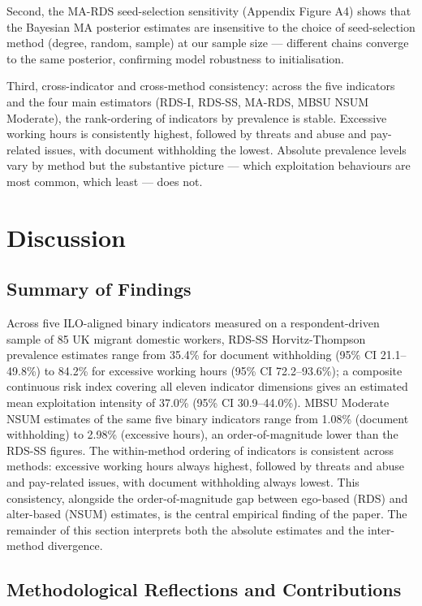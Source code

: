 \documentclass[
  12pt,
  letterpaper,
  DIV=11,
  numbers=noendperiod]{scrartcl}
\begin{document}
Second, the MA-RDS seed-selection sensitivity (Appendix Figure A4) shows
that the Bayesian MA posterior estimates are insensitive to the choice
of seed-selection method (degree, random, sample) at our sample size ---
different chains converge to the same posterior, confirming model
robustness to initialisation.

Third, cross-indicator and cross-method consistency: across the five
indicators and the four main estimators (RDS-I, RDS-SS, MA-RDS, MBSU
NSUM Moderate), the rank-ordering of indicators by prevalence is stable.
Excessive working hours is consistently highest, followed by threats and
abuse and pay-related issues, with document withholding the lowest.
Absolute prevalence levels vary by method but the substantive picture
--- which exploitation behaviours are most common, which least --- does
not.

\section{Discussion}\label{sec-discussion}

\subsection{Summary of Findings}\label{sec-summary}

Across five ILO-aligned binary indicators measured on a
respondent-driven sample of 85 UK migrant domestic workers, RDS-SS
Horvitz-Thompson prevalence estimates range from 35.4\% for document
withholding (95\% CI 21.1--49.8\%) to 84.2\% for excessive working hours
(95\% CI 72.2--93.6\%); a composite continuous risk index covering all
eleven indicator dimensions gives an estimated mean exploitation
intensity of 37.0\% (95\% CI 30.9--44.0\%). MBSU Moderate NSUM estimates
of the same five binary indicators range from 1.08\% (document
withholding) to 2.98\% (excessive hours), an order-of-magnitude lower
than the RDS-SS figures. The within-method ordering of indicators is
consistent across methods: excessive working hours always highest,
followed by threats and abuse and pay-related issues, with document
withholding always lowest. This consistency, alongside the
order-of-magnitude gap between ego-based (RDS) and alter-based (NSUM)
estimates, is the central empirical finding of the paper. The remainder
of this section interprets both the absolute estimates and the
inter-method divergence.

\subsection{Methodological Reflections and
Contributions}\label{sec-contributions}
\end{document}
